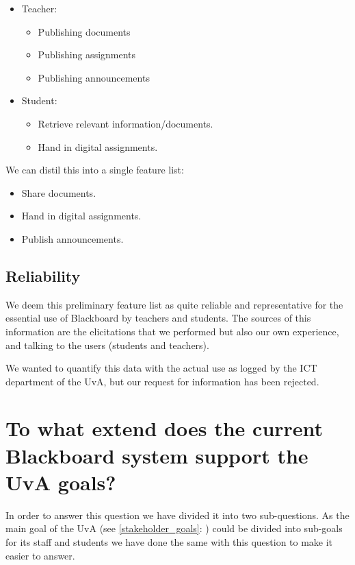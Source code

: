 \begin{itemize}
	\item Teacher:
	\begin{itemize}
		\item Publishing documents
		\item Publishing assignments
		\item Publishing announcements
	\end{itemize}

	\item Student:
	\begin{itemize}
		\item Retrieve relevant information/documents.
		\item Hand in digital assignments.
	\end{itemize}
\end{itemize}

We can distil this into a single feature list:
\begin{itemize}
	\item Share documents.
	\item Hand in digital assignments.
	\item Publish announcements.
\end{itemize}

\subsection{Reliability}
We deem this preliminary feature list as quite reliable and representative for the essential use of Blackboard by teachers and students. The sources of this information are the elicitations that we performed but also our own experience, and talking to the users (students and teachers).

We wanted to quantify this data with the actual use as logged by the ICT department of the UvA, but our request for information has been rejected.
                                                                                                                                               

\section{To what extend does the current Blackboard system support the UvA goals?} \label{uva_goal_question}
In order to answer this question we have divided it into two sub-questions. As the main goal of the UvA (see \ref{stakeholder_goals}: ) could be divided into sub-goals for its staff and students we have done the same with this question to make it easier to answer.

